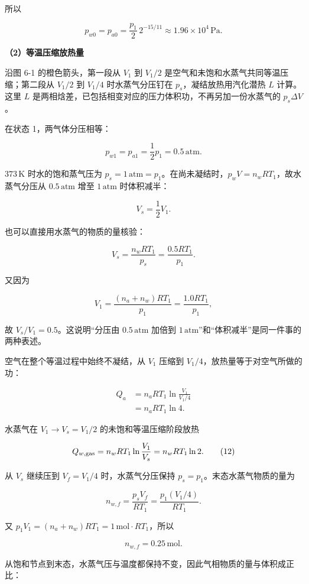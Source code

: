 \documentclass[12pt,a4paper,UTF8]{ctexart}
\begin{document}
所以

\[\boxed{
p_{w0}=p_{a0}
=\frac{p_1}{2}\,2^{-15/11}
\approx1.96\times10^4\,\mathrm{Pa}
}. \tag{8}\]

\textbf{（2）等温压缩放热量}

沿图 6-1 的橙色箭头，第一段从 \(V_1\) 到 \(V_1/2\)
是空气和未饱和水蒸气共同等温压缩；第二段从 \(V_1/2\) 到 \(V_1/4\)
时水蒸气分压钉在 \(p_s\)，凝结放热用汽化潜热 \(L\) 计算。这里 \(L\)
是两相焓差，已包括相变对应的压力体积功，不再另加一份水蒸气的
\(p_s\Delta V\)。

在状态 1，两气体分压相等：

\[p_{w1}=p_{a1}=\frac12p_1=0.5\,\mathrm{atm}. \tag{9}\]

\(373\,\mathrm K\) 时水的饱和蒸气压为
\(p_s=1\,\mathrm{atm}=p_1\)。在尚未凝结时，\(p_wV=n_wRT_1\)，故水蒸气分压从
\(0.5\,\mathrm{atm}\) 增至 \(1\,\mathrm{atm}\) 时体积减半：

\[V_s=\frac12V_1. \tag{10}\]

也可以直接用水蒸气的物质的量核验：

\[V_s=\frac{n_wRT_1}{p_s}
=\frac{0.5RT_1}{p_1}.\]

又因为

\[V_1=\frac{(n_a+n_w)RT_1}{p_1}
=\frac{1.0RT_1}{p_1},\]

故 \(V_s/V_1=0.5\)。这说明``分压由 \(0.5\,\mathrm{atm}\) 加倍到
\(1\,\mathrm{atm}\)''和``体积减半''是同一件事的两种表述。

空气在整个等温过程中始终不凝结，从 \(V_1\) 压缩到
\(V_1/4\)，放热量等于对空气所做的功：

\[\begin{aligned}
Q_a
&=n_aRT_1\ln\frac{V_1}{V_1/4}\\
&=n_aRT_1\ln4.
\end{aligned} \tag{11}\]

水蒸气在 \(V_1\to V_s=V_1/2\) 的未饱和等温压缩阶段放热

\[Q_{w,\rm gas}=n_wRT_1\ln\frac{V_1}{V_s}
=n_wRT_1\ln2. \tag{12}\]

从 \(V_s\) 继续压到 \(V_f=V_1/4\) 时，水蒸气分压保持
\(p_s=p_1\)。末态水蒸气物质的量为

\[n_{w,f}=\frac{p_sV_f}{RT_1}
=\frac{p_1(V_1/4)}{RT_1}.\]

又 \(p_1V_1=(n_a+n_w)RT_1=1\,\mathrm{mol}\cdot RT_1\)，所以

\[n_{w,f}=0.25\,\mathrm{mol}. \tag{13}\]

从饱和节点到末态，水蒸气压与温度都保持不变，因此气相物质的量与体积成正比：
\end{document}
